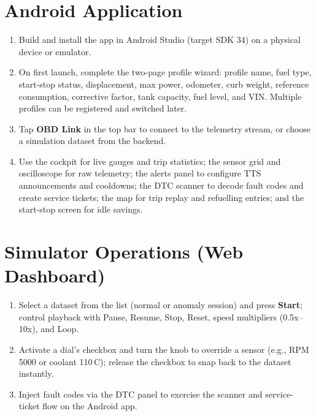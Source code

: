 \documentclass[10pt,a4paper]{report}
\begin{document}
\section{Android Application}
\begin{enumerate}
  \item Build and install the app in Android Studio (target SDK 34) on a physical device or emulator.
  \item On first launch, complete the two-page profile wizard: profile name, fuel type, start-stop status, displacement, max power, odometer, curb weight, reference consumption, corrective factor, tank capacity, fuel level, and VIN. Multiple profiles can be registered and switched later.
  \item Tap \textbf{OBD Link} in the top bar to connect to the telemetry stream, or choose a simulation dataset from the backend.
  \item Use the cockpit for live gauges and trip statistics; the sensor grid and oscilloscope for raw telemetry; the alerts panel to configure TTS announcements and cooldowns; the DTC scanner to decode fault codes and create service tickets; the map for trip replay and refuelling entries; and the start-stop screen for idle savings.
\end{enumerate}

\section{Simulator Operations (Web Dashboard)}
\begin{enumerate}
  \item Select a dataset from the list (normal or anomaly session) and press \textbf{Start}; control playback with Pause, Resume, Stop, Reset, speed multipliers (0.5x--10x), and Loop.
  \item Activate a dial's checkbox and turn the knob to override a sensor (e.g., RPM 5000 or coolant 110\,\textdegree{}C); release the checkbox to snap back to the dataset instantly.
  \item Inject fault codes via the DTC panel to exercise the scanner and service-ticket flow on the Android app.
\end{enumerate}
\end{document}
